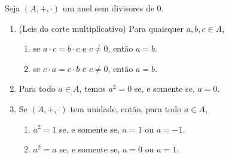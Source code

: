 \begin{proposition}
    Seja $(A, +, \cdot)$ um anel sem divisores de $0$.
        \begin{enumerate}[leftmargin=*, align=left, label=\textbf{(\alph*)}]
            \item (Leis do corte multiplicativo) Para quaisquer $a, b, c \in A$, 
                \begin{enumerate}[label=\roman*.]
                    \item se $a \cdot c = b \cdot c$ e $c \neq 0$, então $a = b$.
                    \item se $c \cdot a = c \cdot b$ e $c \neq 0$, então $a = b$.
                \end{enumerate}
            \item Para todo $a \in A$, temos $a^2 = 0$ se, e somente se, $a=0$.
            \item Se $(A, +, \cdot)$ tem unidade, então, para todo $a \in A$,
                \begin{enumerate}[label=\roman*.]
                    \item $a^2 = 1$ se, e somente se, $a=1$ ou $a=-1$.
                    \item $a^2 = a$ se, e somente se, $a = 0$ ou $a=1$.
                \end{enumerate}
        \end{enumerate}
\end{proposition}


